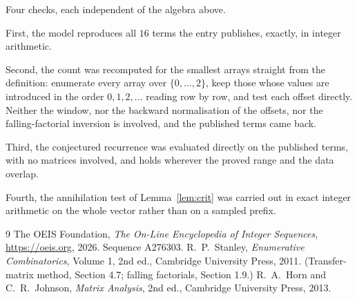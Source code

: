 \documentclass[11pt,a4paper]{article}
\theoremstyle{plain}
\theoremstyle{definition}
\begin{document}
Four checks, each independent of the algebra above.

First, the model reproduces all $16$ terms the entry publishes, exactly, in integer
arithmetic.

Second, the count was recomputed for the smallest arrays straight from the definition:
enumerate every array over $\{0,\dots,2\}$, keep those whose values are introduced in the
order $0,1,2,\dots$ reading row by row, and test each offset directly. Neither the window, nor
the backward normalisation of the offsets, nor the falling-factorial inversion is involved, and
the published terms came back.

Third, the conjectured recurrence was evaluated directly on the published terms, with no
matrices involved, and holds wherever the proved range and the data overlap.

Fourth, the annihilation test of Lemma~\ref{lem:crit} was carried out in exact integer
arithmetic on the whole vector rather than on a sampled prefix.

\begin{thebibliography}{9}
 The OEIS Foundation, \emph{The On-Line Encyclopedia of Integer
Sequences}, \url{https://oeis.org}, 2026. Sequence A276303.
 R.~P.~Stanley, \emph{Enumerative Combinatorics}, Volume 1, 2nd ed.,
Cambridge University Press, 2011. (Transfer-matrix method, Section 4.7; falling factorials,
Section 1.9.)
 R.~A.~Horn and C.~R.~Johnson, \emph{Matrix Analysis}, 2nd ed., Cambridge
University Press, 2013.
\end{thebibliography}
\end{document}
